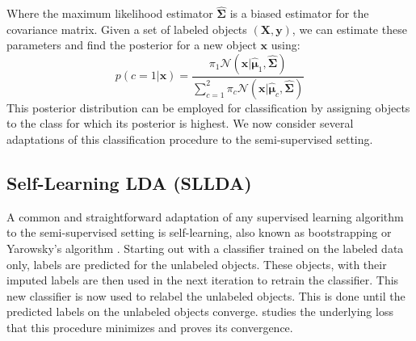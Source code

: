\documentclass[10pt, a4paper, conference]{IEEEtran}
\begin{document}
Where the maximum likelihood estimator $\hat{\mathbf{\Sigma}}$ is a biased estimator for the covariance matrix. Given a set of labeled objects $(\mathbf{X},\mathbf{y})$, we can estimate these parameters and find the posterior for a new object $\mathbf{x}$ using:
\begin{equation}
p(c=1|\mathbf{x})=\frac{\pi_1 \mathcal{N}(\mathbf{x}|\hat{\boldsymbol{\mu}}_1,\hat{\mathbf{\Sigma}})}{\sum_{c=1}^{2} \pi_c \mathcal{N}(\mathbf{x}|\hat{\boldsymbol{\mu}}_c,\hat{\mathbf{\Sigma}})}
\end{equation}
This posterior distribution can be employed for classification by assigning objects to the class for which its posterior is highest. We now consider several adaptations of this classification procedure to the  semi-supervised setting.

\subsection{Self-Learning LDA (SLLDA)}
A common and straightforward adaptation of any supervised learning algorithm to the semi-supervised setting is self-learning, also known as bootstrapping or Yarowsky's algorithm \cite{McLachlan1975,Yarowsky1995}. Starting out with a classifier trained on the labeled data only, labels are  predicted for the unlabeled objects. These objects, with their imputed labels are then used in the next iteration to retrain the classifier. This new classifier is now used to relabel the unlabeled objects. This is done until the predicted labels on the unlabeled objects converge. \cite{Abney2004} studies the underlying loss that this procedure minimizes and proves its convergence.
\end{document}
